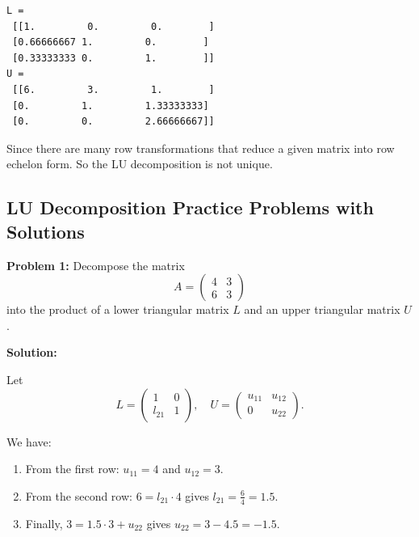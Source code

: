 \documentclass[
  letterpaper,
  DIV=11,
  numbers=noendperiod]{scrreprt}
\providecommand{\tightlist}{%
  \setlength{\itemsep}{0pt}\setlength{\parskip}{0pt}}\usepackage{longtable,booktabs,array}
\theoremstyle{plain}
\theoremstyle{definition}
\theoremstyle{remark}
\begin{document}
\begin{verbatim}
L = 
 [[1.         0.         0.        ]
 [0.66666667 1.         0.        ]
 [0.33333333 0.         1.        ]]
U = 
 [[6.         3.         1.        ]
 [0.         1.         1.33333333]
 [0.         0.         2.66666667]]
\end{verbatim}

\begin{tcolorbox}[enhanced jigsaw, leftrule=.75mm, bottomtitle=1mm, colback=white, toptitle=1mm, opacitybacktitle=0.6, toprule=.15mm, colbacktitle=quarto-callout-note-color!10!white, arc=.35mm, colframe=quarto-callout-note-color-frame, title=\textcolor{quarto-callout-note-color}{\faInfo}\hspace{0.5em}{Note}, titlerule=0mm, rightrule=.15mm, left=2mm, bottomrule=.15mm, breakable, coltitle=black, opacityback=0]

Since there are many row transformations that reduce a given matrix into
row echelon form. So the LU decomposition is not unique.

\end{tcolorbox}

\subsection{LU Decomposition Practice Problems with
Solutions}\label{lu-decomposition-practice-problems-with-solutions}

\textbf{Problem 1:} Decompose the matrix
\[ A = \begin{pmatrix} 4 & 3 \\ 6 & 3 \end{pmatrix} \] into the product
of a lower triangular matrix \(L\) and an upper triangular matrix \(U\).

\textbf{Solution:}

Let
\[ L = \begin{pmatrix} 1 & 0 \\ l_{21} & 1 \end{pmatrix}, \quad U = \begin{pmatrix} u_{11} & u_{12} \\ 0 & u_{22} \end{pmatrix}. \]

We have:

\begin{enumerate}
\def\labelenumi{\arabic{enumi}.}
\tightlist
\item
  From the first row: \(u_{11} = 4\) and \(u_{12} = 3\).
\item
  From the second row: \(6 = l_{21} \cdot 4\) gives
  \(l_{21} = \frac{6}{4} = 1.5\).
\item
  Finally, \(3 = 1.5 \cdot 3 + u_{22}\) gives
  \(u_{22} = 3 - 4.5 = -1.5\).
\end{enumerate}
\end{document}
